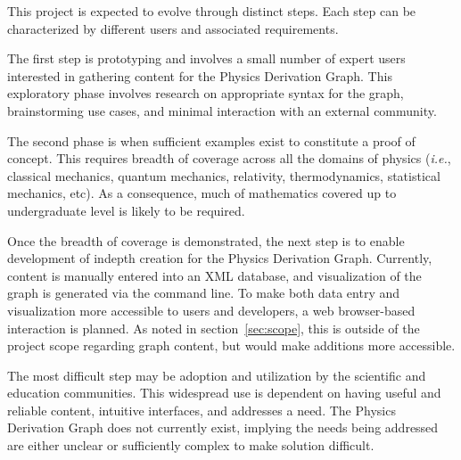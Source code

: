 \documentclass{article}
\newcommand{\ie}{\textit{i.e.}} %
\begin{document}
\begin{multicols}{2}
This project is expected to evolve through distinct steps. Each step can be characterized by different users and associated requirements. 

The first step is prototyping and involves a small number of expert users interested in gathering content for the Physics Derivation Graph. This exploratory phase involves research on appropriate syntax for the graph, brainstorming use cases, and minimal interaction with an external community. 

The second phase is when sufficient examples exist to constitute a proof of concept. This requires breadth of coverage across all the domains of physics (\ie, classical mechanics, quantum mechanics, relativity, thermodynamics, statistical mechanics, etc). As a consequence, much of mathematics covered up to undergraduate level is likely to be required. 

Once the breadth of coverage is demonstrated, the next step is to enable development of indepth creation for the Physics Derivation Graph. Currently, content is manually entered into an XML database, and visualization of the graph is generated via the command line. To make both data entry and visualization more accessible to users and developers, a web browser-based interaction is planned. As noted in section~\ref{sec:scope}, this is outside of the project scope regarding graph content, but would make additions more accessible.

The most difficult step may be adoption and utilization by the scientific and education communities. This widespread use is dependent on having useful and reliable content, intuitive interfaces, and addresses a need. The Physics Derivation Graph does not currently exist, implying the needs being addressed are either unclear or sufficiently complex to make solution difficult. 


\end{multicols}
\end{document}
